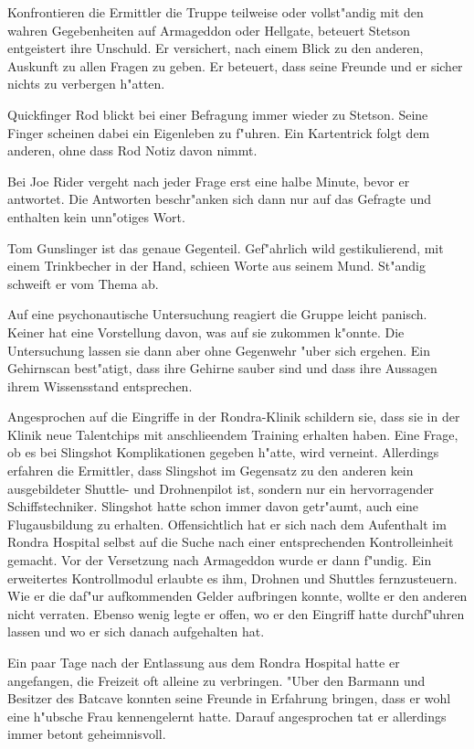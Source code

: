 Konfrontieren die Ermittler die Truppe teilweise oder vollst"andig mit den wahren Gegebenheiten auf Armageddon oder Hellgate, beteuert Stetson entgeistert ihre Unschuld. Er versichert, nach einem Blick zu den anderen, Auskunft zu allen Fragen zu geben. Er beteuert, dass seine Freunde und er sicher nichts zu verbergen h"atten.

Quickfinger Rod blickt bei einer Befragung immer wieder zu Stetson. Seine Finger scheinen dabei ein Eigenleben zu f"uhren. Ein Kartentrick folgt dem anderen, ohne dass Rod Notiz davon nimmt.

Bei Joe Rider vergeht nach jeder Frage erst eine halbe Minute, bevor er antwortet. Die Antworten beschr"anken sich dann nur auf das Gefragte und enthalten kein unn"otiges Wort.

Tom Gunslinger ist das genaue Gegenteil. Gef"ahrlich wild gestikulierend, mit einem Trinkbecher in der Hand, schie\3en Worte aus seinem Mund. St"andig schweift er vom Thema ab.


Auf eine psychonautische Untersuchung reagiert die Gruppe leicht panisch. Keiner hat eine Vorstellung davon, was auf sie zukommen k"onnte. Die Untersuchung lassen sie dann aber ohne Gegenwehr "uber sich ergehen. Ein Gehirnscan best"atigt, dass ihre Gehirne sauber sind und dass ihre Aussagen ihrem Wissensstand entsprechen.

Angesprochen auf die Eingriffe in der Rondra-Klinik schildern sie, dass sie in der Klinik neue Talentchips mit anschlie\3endem Training erhalten haben. Eine Frage, ob es bei Slingshot Komplikationen gegeben h"atte, wird verneint. Allerdings erfahren die Ermittler, dass Slingshot im Gegensatz zu den anderen kein ausgebildeter Shuttle- und Drohnenpilot ist, sondern nur ein hervorragender Schiffstechniker. Slingshot hatte schon immer davon getr"aumt, auch eine Flugausbildung zu erhalten. Offensichtlich hat er sich nach dem Aufenthalt im Rondra Hospital selbst auf die Suche nach einer entsprechenden Kontrolleinheit gemacht. Vor der Versetzung nach Armageddon wurde er dann f"undig. Ein erweitertes Kontrollmodul erlaubte es ihm, Drohnen und Shuttles fernzusteuern. Wie er die daf"ur aufkommenden Gelder aufbringen konnte, wollte er den anderen nicht verraten. Ebenso wenig legte er offen, wo er den Eingriff hatte durchf"uhren lassen und wo er sich danach aufgehalten hat.

Ein paar Tage nach der Entlassung aus dem Rondra Hospital hatte er angefangen, die Freizeit oft alleine zu verbringen. "Uber den Barmann und Besitzer des Batcave konnten seine Freunde in Erfahrung bringen, dass er wohl eine h"ubsche Frau kennengelernt hatte. Darauf angesprochen tat er allerdings immer betont geheimnisvoll.

